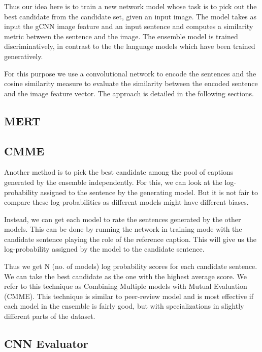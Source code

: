 Thus our idea here is to train a new network model whose task is to pick out the
best candidate from the candidate set, given an input image. 
The model takes as input the gCNN image feature and an input sentence and
computes a similarity metric between the sentence and the image. 
The ensemble model is trained discriminatively, in contrast to the the language
models which have been trained generatively.

For this purpose we use a convolutional network to encode the sentences and the
cosine similarity measure to evaluate the similarity between the encoded
sentence and the image feature vector. 
The approach is detailed in the following sections.

\subsection{MERT}
\subsection{CMME}

Another method is to pick the best candidate among the pool of captions
generated by the ensemble independently.
For this, we can look at the log-probability assigned to the sentence by the
generating model.
But it is not fair to compare these log-probabilities as different models might
have different biases.

Instead, we can get each model to rate the sentences generated by the other
models.
This can be done by running the network in training mode with the candidate
sentence playing the role of the reference caption.
This will give us the log-probability assigned by the model to the candidate
sentence.

Thus we get N (no. of models) log probability scores for each candidate
sentence.
We can take the best candidate as the one with the highest average score.
We refer to this technique as Combining Multiple models with Mutual Evaluation
(CMME).
This technique is similar to peer-review model and is most effective if each
model in the ensemble is fairly good, but with specializations in slightly
different parts of the dataset.

\subsection{CNN Evaluator}

